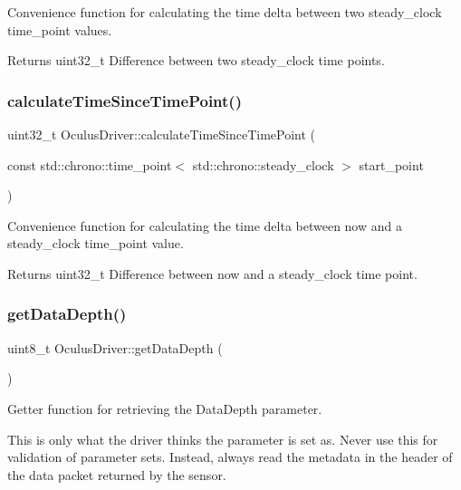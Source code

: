 Convenience function for calculating the time delta between two steady\+\_\+clock time\+\_\+point values.

\begin{DoxyReturn}{Returns}
uint32\+\_\+t Difference between two steady\+\_\+clock time points. 
\end{DoxyReturn}
\mbox{\label{classOculusDriver_a38c77276ca90f7f4c76c125c377c12af}} 
\subsubsection{\texorpdfstring{calculate\+Time\+Since\+Time\+Point()}{calculateTimeSinceTimePoint()}}
{\footnotesize\ttfamily uint32\+\_\+t Oculus\+Driver\+::calculate\+Time\+Since\+Time\+Point (\begin{DoxyParamCaption}\item[{const std\+::chrono\+::time\+\_\+point$<$ std\+::chrono\+::steady\+\_\+clock $>$}]{start\+\_\+point }\end{DoxyParamCaption})}

Convenience function for calculating the time delta between now and a steady\+\_\+clock time\+\_\+point value.

\begin{DoxyReturn}{Returns}
uint32\+\_\+t Difference between now and a steady\+\_\+clock time point. 
\end{DoxyReturn}
\mbox{\label{classOculusDriver_aed562fa0262b63b40dfa9ae6c72264e2}} 
\subsubsection{\texorpdfstring{get\+Data\+Depth()}{getDataDepth()}}
{\footnotesize\ttfamily uint8\+\_\+t Oculus\+Driver\+::get\+Data\+Depth (\begin{DoxyParamCaption}{ }\end{DoxyParamCaption})}

Getter function for retrieving the Data\+Depth parameter.

This is only what the driver thinks the parameter is set as. Never use this for validation of parameter sets. Instead, always read the metadata in the header of the data packet returned by the sensor.

